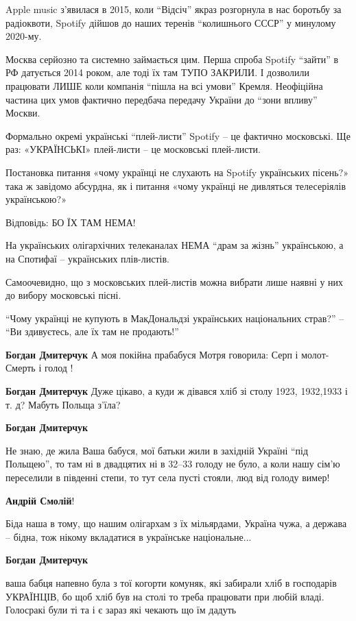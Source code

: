 \begin{itemize}
\begin{itemize}
Apple music з'явилася в 2015, коли \enquote{Відсіч} якраз розгорнула в нас боротьбу за
радіоквоти, Spotify дійшов до наших теренів \enquote{колишнього СССР} у минулому
2020-му.

Москва серйозно та системно займається цим. Перша спроба Spotify \enquote{зайти} в РФ
датується 2014 роком, але тоді їх там ТУПО ЗАКРИЛИ. І дозволили працювати ЛИШЕ
коли компанія \enquote{пішла на всі умови} Кремля. Неофіційна частина цих умов фактично
передбача передачу України до \enquote{зони впливу} Москви.

Формально окремі українські \enquote{плей-листи} Spotify – це фактично московські. Ще
раз: «УКРАЇНСЬКІ» плей-листи – це московські плей-листи.

Постановка питання «чому українці не слухають на Spotify українських пісень?»
така ж завідомо абсурдна, як і питання «чому українці не дивляться телесеріялів
українською?»

Відповідь: БО ЇХ ТАМ НЕМА!

На українських олігархічних телеканалах НЕМА \enquote{драм за жізнь}
українською, а на Спотифаї – українських плів-листів.

Самоочевидно, що з московських плей-листів можна вибрати лише наявні у них до
вибору московські пісні.

\enquote{Чому українці не купують в МакДональдзі українських національних
страв?} – \enquote{Ви здивуєтесь, але їх там не продають!}

\textbf{Богдан Дмитерчук}
А моя покійна прабабуся Мотря говорила:
Серп і молот- Смерть і голод !

\textbf{Богдан Дмитерчук} Дуже цікаво, а куди ж дівався хліб зі столу 1923, 1932,1933 і т. д? Мабуть Польща з'їла?

\textbf{Богдан Дмитерчук} 

Не знаю, де жила Ваша бабуся, мої батьки жили в західній Україні \enquote{під Польщею},
то там ні в двадцятих ні в 32–33 голоду не було, а коли нашу сім'ю переселили в
південні степи, то тут села пусті стояли, люд від голоду вимер!


\textbf{Андрій Смолій}! 

Біда наша в тому, що нашим олігархам з їх мільярдами, Україна чужа, а держава –
бідна, тож нікому вкладатися в українське національне...

\textbf{Богдан Дмитерчук} 

ваша бабця напевно була з тої когорти комуняк, які забирали хліб в господарів
УКРАЇНЦІВ, бо щоб хліб був на столі то треба працювати при любій владі.
Голосракі були ті та і є зараз які чекають що їм дадуть


\end{itemize}
\end{itemize}
